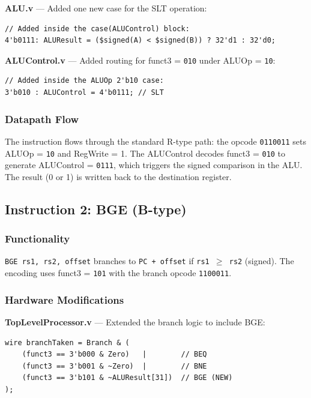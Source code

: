 \documentclass[12pt,a4paper]{article}
\begin{document}
\textbf{ALU.v} --- Added one new case for the SLT operation:
\begin{lstlisting}[style=verilog, caption={ALU modification for SLT}]
// Added inside the case(ALUControl) block:
4'b0111: ALUResult = ($signed(A) < $signed(B)) ? 32'd1 : 32'd0;
\end{lstlisting}

\textbf{ALUControl.v} --- Added routing for funct3 = \texttt{010} under ALUOp = \texttt{10}:
\begin{lstlisting}[style=verilog, caption={ALUControl modification for SLT}]
// Added inside the ALUOp 2'b10 case:
3'b010 : ALUControl = 4'b0111; // SLT
\end{lstlisting}

\subsubsection{Datapath Flow}
The instruction flows through the standard R-type path: the opcode \texttt{0110011} sets ALUOp = \texttt{10} and RegWrite = 1. The ALUControl decodes funct3 = \texttt{010} to generate ALUControl = \texttt{0111}, which triggers the signed comparison in the ALU. The result (0 or 1) is written back to the destination register.

\subsection{Instruction 2: BGE (B-type)}

\subsubsection{Functionality}
\texttt{BGE rs1, rs2, offset} branches to \texttt{PC + offset} if \texttt{rs1 $\geq$ rs2} (signed). The encoding uses funct3 = \texttt{101} with the branch opcode \texttt{1100011}.

\subsubsection{Hardware Modifications}

\textbf{TopLevelProcessor.v} --- Extended the branch logic to include BGE:
\begin{lstlisting}[style=verilog, caption={Branch logic modification for BGE}]
wire branchTaken = Branch & (
    (funct3 == 3'b000 & Zero)   |        // BEQ
    (funct3 == 3'b001 & ~Zero)  |        // BNE
    (funct3 == 3'b101 & ~ALUResult[31])  // BGE (NEW)
);
\end{lstlisting}
\end{document}
